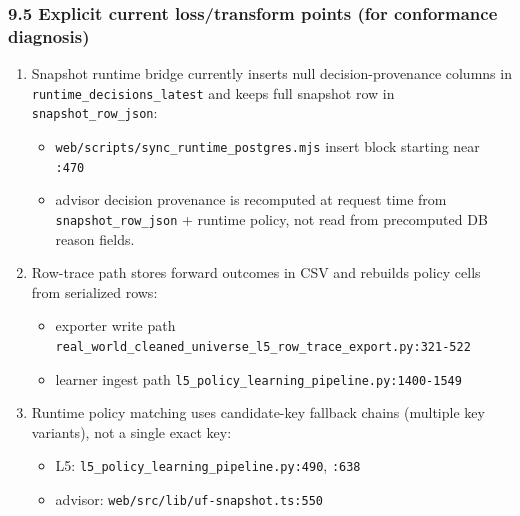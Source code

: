 \documentclass[
]{article}
\providecommand{\tightlist}{%
  \setlength{\itemsep}{0pt}\setlength{\parskip}{0pt}}
\begin{document}
\subsubsection{9.5 Explicit current loss/transform points (for
conformance
diagnosis)}\label{95-explicit-current-losstransform-points-for-conformance-diagnosis}

\begin{enumerate}
\def\labelenumi{\arabic{enumi}.}
\item
  Snapshot runtime bridge currently inserts null decision-provenance
  columns in \texttt{runtime\_decisions\_latest} and keeps full snapshot
  row in \texttt{snapshot\_row\_json}:

  \begin{itemize}
  \tightlist
  \item
    \texttt{web/scripts/sync\_runtime\_postgres.mjs} insert block
    starting near \texttt{:470}
  \item
    advisor decision provenance is recomputed at request time from
    \texttt{snapshot\_row\_json} + runtime policy, not read from
    precomputed DB reason fields.
  \end{itemize}
\item
  Row-trace path stores forward outcomes in CSV and rebuilds policy
  cells from serialized rows:

  \begin{itemize}
  \tightlist
  \item
    exporter write path
    \texttt{real\_world\_cleaned\_universe\_l5\_row\_trace\_export.py:321-522}
  \item
    learner ingest path
    \texttt{l5\_policy\_learning\_pipeline.py:1400-1549}
  \end{itemize}
\item
  Runtime policy matching uses candidate-key fallback chains (multiple
  key variants), not a single exact key:

  \begin{itemize}
  \tightlist
  \item
    L5: \texttt{l5\_policy\_learning\_pipeline.py:490}, \texttt{:638}
  \item
    advisor: \texttt{web/src/lib/uf-snapshot.ts:550}
  \end{itemize}
\end{enumerate}
\end{document}
